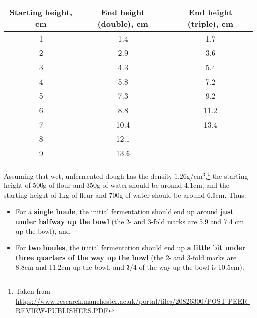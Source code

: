 \documentclass[a4paper,12pt]{scrreprt}
\theoremstyle{definition}
\theoremstyle{plain}
\theoremstyle{remark}
\begin{document}
\begin{centering}

  \begin{tabular}{ccc}
    Starting height, cm & End height (double), cm & End height (triple), cm \\
    \midrule
    1 & 1.4 & 1.7 \\
    2 & 2.9 & 3.6 \\
    3 & 4.3 & 5.4 \\
    4 & 5.8 & 7.2 \\
    5 & 7.3 & 9.2 \\
    6 & 8.8 & 11.2 \\
    7 & 10.4 & 13.4 \\
    8 & 12.1 \\
    9 & 13.6
  \end{tabular}

\end{centering}

Assuming that wet, unfermented dough has the density $1.26$g/cm$^{3}$,\footnote{Taken from \url{https://www.research.manchester.ac.uk/portal/files/20826300/POST-PEER-REVIEW-PUBLISHERS.PDF}} the starting height of 500g of flour and 350g of water should be around $4.1$cm, and the starting height of 1kg of flour and 700g of water should be around $6.0$cm. Thus:

\begin{itemize}
  \item For a \textbf{single boule}, the initial fermentation should end up around \textbf{just under halfway up the bowl} (the 2- and 3-fold marks are 5.9 and 7.4 cm up the bowl), and

  \item For \textbf{two boules}, the initial fermentation should end up \textbf{a little bit under three quarters of the way up the bowl} (the 2- and 3-fold marks are 8.8cm and 11.2cm up the bowl, and $3/4$ of the way up the bowl is 10.5cm).
\end{itemize}
\end{document}
